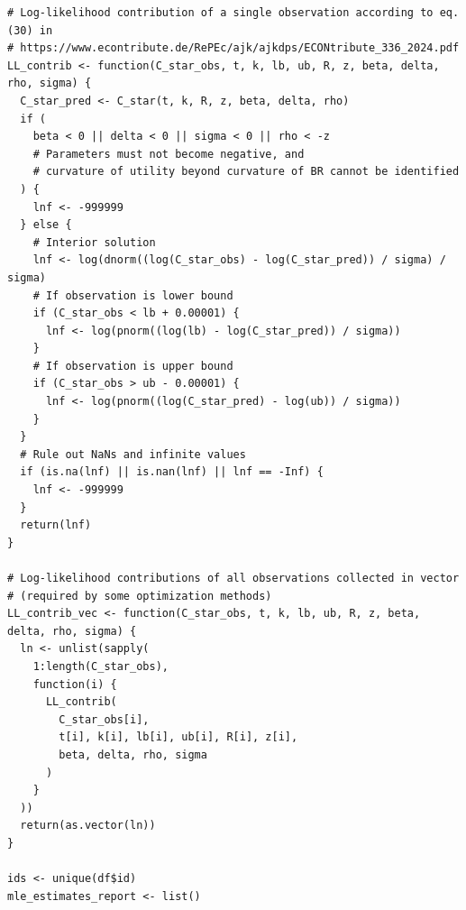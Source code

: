 \begin{lstlisting}
# Log-likelihood contribution of a single observation according to eq. (30) in
# https://www.econtribute.de/RePEc/ajk/ajkdps/ECONtribute_336_2024.pdf
LL_contrib <- function(C_star_obs, t, k, lb, ub, R, z, beta, delta, rho, sigma) {
  C_star_pred <- C_star(t, k, R, z, beta, delta, rho)
  if (
    beta < 0 || delta < 0 || sigma < 0 || rho < -z
    # Parameters must not become negative, and
    # curvature of utility beyond curvature of BR cannot be identified
  ) {
    lnf <- -999999
  } else {
    # Interior solution
    lnf <- log(dnorm((log(C_star_obs) - log(C_star_pred)) / sigma) / sigma)
    # If observation is lower bound
    if (C_star_obs < lb + 0.00001) {
      lnf <- log(pnorm((log(lb) - log(C_star_pred)) / sigma))
    }
    # If observation is upper bound
    if (C_star_obs > ub - 0.00001) {
      lnf <- log(pnorm((log(C_star_pred) - log(ub)) / sigma))
    }
  }
  # Rule out NaNs and infinite values
  if (is.na(lnf) || is.nan(lnf) || lnf == -Inf) {
    lnf <- -999999
  }
  return(lnf)
}

# Log-likelihood contributions of all observations collected in vector
# (required by some optimization methods)
LL_contrib_vec <- function(C_star_obs, t, k, lb, ub, R, z, beta, delta, rho, sigma) {
  ln <- unlist(sapply(
    1:length(C_star_obs),
    function(i) {
      LL_contrib(
        C_star_obs[i],
        t[i], k[i], lb[i], ub[i], R[i], z[i],
        beta, delta, rho, sigma
      )
    }
  ))
  return(as.vector(ln))
}

ids <- unique(df$id)
mle_estimates_report <- list()


\end{lstlisting}
